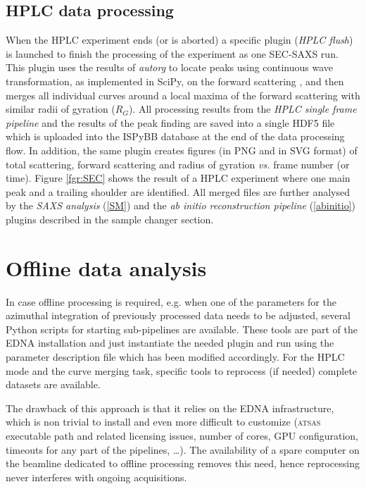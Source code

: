 \documentclass[preprint,pdf]{iucr}              %
\begin{document}
\subsection{HPLC data processing}
When the HPLC experiment ends (or is aborted) a specific plugin
(\textit{HPLC flush}) is launched to finish the processing of the experiment as
one SEC-SAXS run. 
This plugin uses the results of \textit{autorg} to locate peaks using
continuous wave transformation, as implemented in SciPy, on the forward
scattering \cite{cwt,scipy}, and then merges all individual curves around a local maxima
of the forward scattering with similar radii of gyration ($R_G$).
All processing results from the \textit{HPLC single frame pipeline} and the results of
the peak finding are saved into a single HDF5 file which is uploaded into the
ISPyBB database at the end of the data processing flow.
In addition, the same plugin creates figures (in PNG and in SVG format) of 
total scattering, forward scattering and radius of gyration \textit{vs.} frame
number (or time).
Figure \ref{fgr:SEC} shows the result of a HPLC
experiment where one main peak and a trailing shoulder are identified.
All merged files are further analysed by the \textit{SAXS analysis}
(\ref{SM}) and the \textit{ab initio reconstruction pipeline}
(\ref{abinitio}) plugins described in the sample changer section.

\section{Offline data analysis}
In case offline processing is required, e.g. when one of the parameters for
the azimuthal integration of previously processed data needs to be adjusted,
several Python scripts for starting sub-pipelines are available.
These tools are part of the EDNA installation and just instantiate the needed
plugin and run using the parameter description file which has been modified
accordingly.
For the HPLC mode and the curve merging task, specific tools to reprocess (if
needed) complete datasets are available.

The drawback of this approach is that it relies on the EDNA infrastructure, which is
non trivial to install and even more difficult to customize 
(\textsc{atsas} executable path and related licensing issues, number of cores,
GPU configuration, timeouts for any part of the pipelines, \ldots).
The availability of a spare computer on the beamline dedicated to offline
processing removes this need, hence reprocessing never interferes with ongoing
acquisitions.
\end{document}
